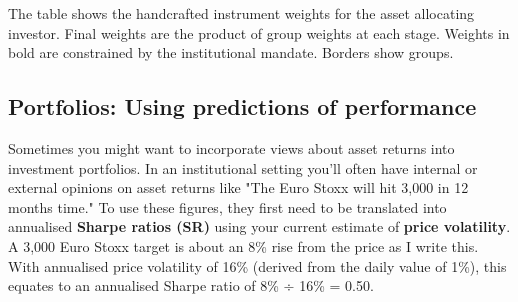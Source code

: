 
The table shows the handcrafted instrument weights for the asset allocating investor. Final weights are the product of group weights at each stage. Weights in bold are constrained by the institutional mandate. Borders show groups.

\subsection*{Portfolios: Using predictions of performance}

Sometimes you might want to incorporate views about asset returns into investment portfolios. In an institutional setting you'll often have internal or external opinions on asset returns like "The Euro Stoxx will hit 3,000 in 12 months time." To use these figures, they first need to be translated into annualised \textbf{Sharpe ratios (SR)} using your current estimate of \textbf{price volatility}. A 3,000 Euro Stoxx target is about an 8\% rise from the price as I write this. With annualised price volatility of 16\% (derived from the daily value of 1\%), this equates to an annualised Sharpe ratio of 8\% ÷ 16\% = 0.50.

